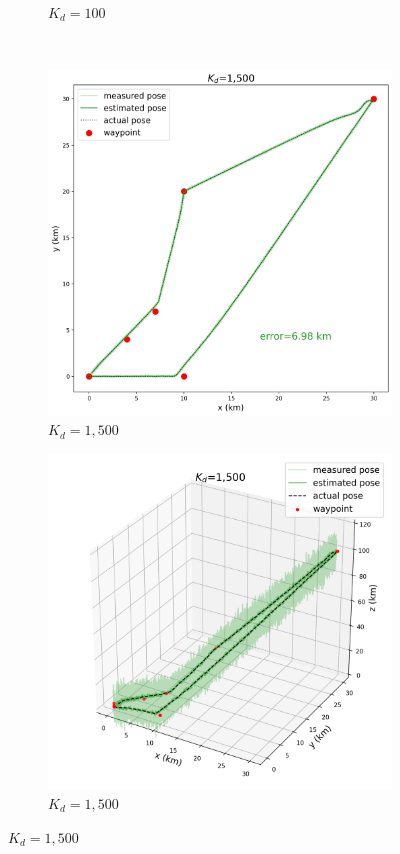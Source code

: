 \begin{figure}[h]
\begin{subfigure}[t]{0.24\textwidth}
		\caption{$K_d=100$}
	\end{subfigure} \\
	\hfill
	\begin{subfigure}[t]{0.24\textwidth}
		\centering
		\includegraphics[width=\linewidth]{figures/Dgain_D15_2d.png}
		\caption{$K_d=1,500$}
	\end{subfigure} 
	\hfill
	\begin{subfigure}[t]{0.24\textwidth}
		\centering
		\includegraphics[width=\linewidth]{figures/Dgain_D15_3d.png}
		\caption{$K_d=1,500$}
	\end{subfigure} 
	

\end{figure}
